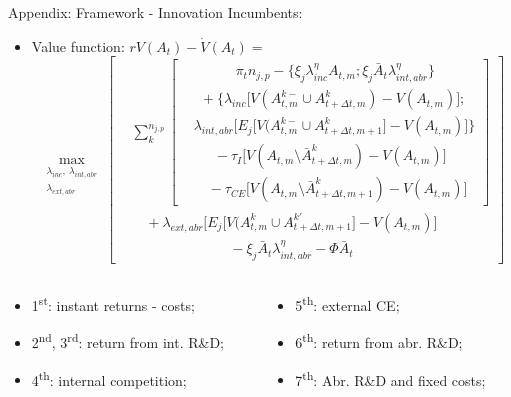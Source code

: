 \documentclass[11pt]{beamer}
\begin{document}
\begin{frame}{Appendix: Framework - Innovation}
Incumbents:
	\begin{itemize}
	\item Value function: $rV(A_t) - \dot{V}(A_t) =$\vspace{-3mm} $$ \max_{\substack{\lambda_{inc},\:\lambda_{int, abr}\\\lambda_{ext, abr}}}\left[\begin{aligned}
		&\sum_k^{n_{j, p}}\left[\begin{aligned}
			&\qquad\quad\pi_t n_{j, p} - \{\xi_j\lambda_{inc}^{\eta}A_{t,m};\xi_j\bar{A}_t\lambda_{int, abr}^{\eta}\}\\
			&\ \ + \{\lambda_{inc}\big[V(A_{t,m}^{k-}\cup A_{t+\Delta t,m}^{k}) - V(A_{t,m})\big];\\
			& \lambda_{int, abr}\big[E_j\big[V(A_{t,m}^{k-}\cup A_{t+\Delta t,m+1}^{k}\big] - V(A_{t,m})\big]\}\\
			&\quad\ \ - \tau_I\big[V(A_{t,m}\setminus \bar{A}_{t+\Delta t,m}^{k}) - V(A_{t,m})\big]\\
			&\quad- \tau_{CE}\big[V(A_{t,m}\setminus\bar{A}_{t+\Delta t,m+1}^{k}) - V(A_{t,m})\big]
		\end{aligned}\right]\\
		&\quad+ \lambda_{ext, abr}\big[E_j\big[V(A_{t,m}^{k}\cup A_{t+\Delta t,m+1}^{k'}\big] - V(A_{t,m})\big]\\
		&\qquad\qquad\qquad\quad- \xi_j\bar{A}_t\lambda_{int, abr}^{\eta} - \Phi\bar{A}_t
	\end{aligned}\right]$$
	\end{itemize}
	\vspace{-3mm}
	\begin{columns}
	\begin{column}{0.5\textwidth}
	\begin{itemize}\itemsep3pt	
   	\item 1\textsuperscript{st}: instant returns - costs;
	\item 2\textsuperscript{nd}, 3\textsuperscript{rd}: return from int. R\&D;
	\item 4\textsuperscript{th}: internal competition;
	\end{itemize}
	\end{column}
	\begin{column}{0.5\textwidth}
	\begin{itemize}\itemsep3pt	
	\item 5\textsuperscript{th}: external CE;
	\item 6\textsuperscript{th}: return from abr. R\&D;
	\item 7\textsuperscript{th}: Abr. R\&D and fixed costs;
	\end{itemize}    
	\end{column}
	\end{columns}			
\end{frame}
\end{document}
